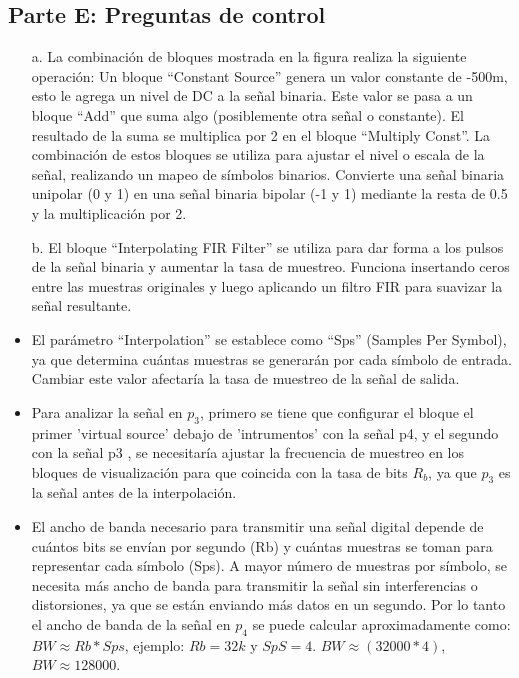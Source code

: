 \documentclass{journal}[IEEEtran, twocolumn]             %
\begin{document}
\begin{multicols}{2}
\subsection{Parte E: Preguntas de control}
\begin{itemize}
    \item[a.] La combinación de bloques mostrada en la figura realiza la siguiente operación: 
    Un bloque ``Constant Source'' genera un valor constante de -500m, esto le agrega un nivel de DC a la señal binaria. Este valor se pasa a un bloque ``Add'' que suma algo (posiblemente otra señal o constante). El resultado de la suma se multiplica por 2 en el bloque ``Multiply Const''. La combinación de estos bloques se utiliza para ajustar el nivel o escala de la señal, realizando un mapeo de símbolos binarios. Convierte una señal binaria unipolar (0 y 1) en una señal binaria bipolar (-1 y 1) mediante la resta de 0.5 y la multiplicación por 2.
    
   \item[b.] El bloque ``Interpolating FIR Filter'' se utiliza para dar forma a los pulsos de la señal binaria y aumentar la tasa de muestreo. Funciona insertando ceros entre las muestras originales y luego aplicando un filtro FIR para suavizar la señal resultante.

    
    \item El parámetro ``Interpolation''  se establece como ``Sps'' (Samples Per Symbol), ya que determina cuántas muestras se generarán por cada símbolo de entrada. Cambiar este valor afectaría la tasa de muestreo de la señal de salida.
    
    \item Para analizar la señal en \(p_3\), primero se tiene que configurar el bloque el primer 'virtual source' debajo de 'intrumentos' con la señal p4, y el segundo con la señal p3 , se necesitaría ajustar la frecuencia de muestreo en los bloques de visualización para que coincida con la tasa de bits \(R_b\), ya que \(p_3\) es la señal antes de la interpolación.
    
    \item El ancho de banda necesario para transmitir una señal digital depende de cuántos bits se envían por segundo (Rb) y cuántas muestras se toman para representar cada símbolo (Sps). A mayor número de muestras por símbolo, se necesita más ancho de banda para transmitir la señal sin interferencias o distorsiones, ya que se están enviando más datos en un segundo. Por lo tanto el ancho de banda de la señal en \(p_4\) se puede calcular aproximadamente como:  \(BW \approx Rb*Sps\), ejemplo:  \(Rb=32k\) y   \(SpS= 4\). \(BW \approx {(32000*4)}\), \(BW \approx  128000\).
    

\end{itemize}
\end{multicols}
\end{document}
